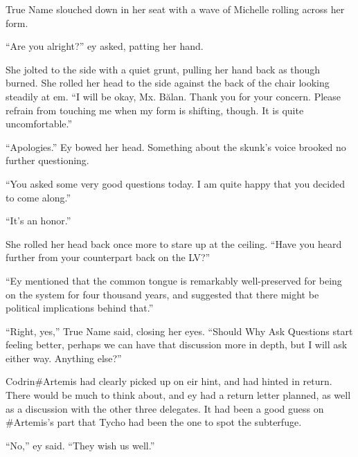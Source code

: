 True Name slouched down in her seat with a wave of Michelle rolling across her form.

``Are you alright?'' ey asked, patting her hand.

She jolted to the side with a quiet grunt, pulling her hand back as though burned. She rolled her head to the side against the back of the chair looking steadily at em. ``I will be okay, Mx. Bălan. Thank you for your concern. Please refrain from touching me when my form is shifting, though. It is quite uncomfortable.''

``Apologies.'' Ey bowed her head. Something about the skunk's voice brooked no further questioning.

``You asked some very good questions today. I am quite happy that you decided to come along.''

``It's an honor.''

She rolled her head back once more to stare up at the ceiling. ``Have you heard further from your counterpart back on the LV?''

``Ey mentioned that the common tongue is remarkably well-preserved for being on the system for four thousand years, and suggested that there might be political implications behind that.''

``Right, yes,'' True Name said, closing her eyes. ``Should Why Ask Questions start feeling better, perhaps we can have that discussion more in depth, but I will ask either way. Anything else?''

Codrin\#Artemis had clearly picked up on eir hint, and had hinted in return. There would be much to think about, and ey had a return letter planned, as well as a discussion with the other three delegates. It had been a good guess on \#Artemis's part that Tycho had been the one to spot the subterfuge.

``No,'' ey said. ``They wish us well.''
